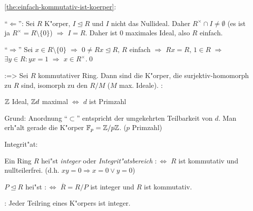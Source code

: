 \proof \ref{the:einfach-kommutativ-ist-koerper}:{
  ``$\Leftarrow$'': Sei $R$ K"orper, $I\unlhd R$ und $I$ nicht das Nullideal.
  Daher $R^\times\cap I\neq \emptyset$ (es ist ja $R^\times =R\setminus\{0\}$) $\Rightarrow$ $I=R$. Daher ist
  $0$ maximales Ideal, also $R$ einfach.
  
  ``$\Rightarrow$'' Sei $x\in R\setminus \{0\}$ $\Rightarrow$ $0\neq Rx\unlhd R$, $R$ einfach $\Rightarrow$ $Rx=R$,
  $1\in R$ $\Rightarrow$ $\exists y\in R:yx=1$ $\Rightarrow$ $x\in R^\times$.\qed
  }
\corollary:=>{
  Sei $R$ kommutativer Ring. Dann sind die K"orper, die surjektiv-homomorph
  zu $R$ sind, isomorph zu den $R/M$ ($M$ max. Ideale).
  }
\example:{
  $\mathbb Z$ Ideal, $\mathbb Z d$ maximal $\iff$ $d$ ist Primzahl
  
  Grund: Anordnung ``$\subset$'' entspricht der umgekehrten Teilbarkeit von $d$.
  Man erh"alt gerade die K"orper $\mathbb{F}_p=\mathbb Z/ p\mathbb Z$. ($p$ Primzahl)
  }
 Integrit"at:{
  Ein Ring $R$ hei"st \emph{integer} oder \emph{Integrit"atsbereich}
  $:\iff$ $R$ ist kommutativ und nullteilerfrei. (d.h. $xy=0\Rightarrow x=0\lor y=0$)
  
  $P\unlhd R$ hei"st \emph{} $:\iff$ $\overline R=R/P$
  ist integer und $R$ ist kommutativ.
  }
\example:{
  Jeder Teilring eines K"orpers ist integer.
  }


